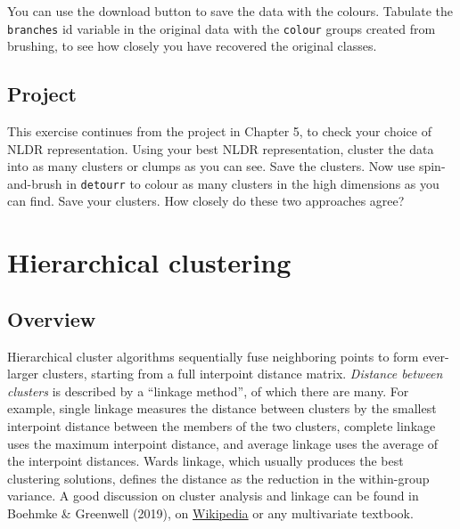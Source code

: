 \documentclass[
  letterpaper,
]{krantz}
\begin{document}
You can use the download button to save the data with the colours.
Tabulate the \texttt{branches} id variable in the original data with the
\texttt{colour} groups created from brushing, to see how closely you
have recovered the original classes.

\section*{Project}\label{project-2}


This exercise continues from the project in Chapter 5, to check your
choice of NLDR representation. Using your best NLDR representation,
cluster the data into as many clusters or clumps as you can see. Save
the clusters. Now use spin-and-brush in \texttt{detourr} to colour as
many clusters in the high dimensions as you can find. Save your
clusters. How closely do these two approaches agree?


\chapter{Hierarchical clustering}\label{sec-hclust}



\section{Overview}\label{overview}

Hierarchical cluster algorithms sequentially fuse neighboring points to
form ever-larger clusters, starting from a full interpoint distance
matrix. \emph{Distance between clusters} is described by a ``linkage
method'', of which there are many. For example, single linkage measures
the distance between clusters by the smallest interpoint distance
between the members of the two clusters, complete linkage uses the
maximum interpoint distance, and average linkage uses the average of the
interpoint distances. Wards linkage, which usually produces the best
clustering solutions, defines the distance as the reduction in the
within-group variance. A good discussion on cluster analysis and linkage
can be found in Boehmke \& Greenwell (2019), on
\href{https://en.wikipedia.org/wiki/Cluster_analysis}{Wikipedia} or any
multivariate textbook.
\end{document}
